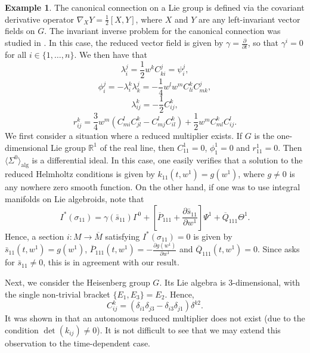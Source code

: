 \documentclass[11pt]{article}
\theoremstyle{plain}
\theoremstyle{definition}
\newtheorem{example}{Example}
\begin{document}
\begin{example}
The canonical connection on a Lie group is defined via the covariant derivative operator $\nabla_X Y=\frac{1}{2}[X,Y]$, where $X$ and $Y$ are any left-invariant vector fields on $G$. The invariant inverse problem for the canonical connection was studied in \cite{crampin2008invariantinv,muzsnay2005invariantinv}. In this case, the reduced vector field is given by $\gamma=\frac{\partial}{\partial t}$, so that $\gamma^i=0$ for all $i\in \{1,\dots,n\}$. We then have that
\begin{equation*}
    \lambda_i^j=\frac{1}{2}w^k C_{ki}^j=\psi_i^j,
\end{equation*}
\begin{equation*}
    \phi_i^j=-\lambda_i^k \lambda_k^j=-\frac{1}{4}w^l w^m C_{li}^k C_{mk}^j,
\end{equation*}
\begin{equation*}
    \lambda_{ij}^k=-\frac{1}{2}C_{ij}^k,
\end{equation*}
\begin{equation*}
    r_{ij}^k=\frac{3}{4}w^m(C_{mi}^l C_{jl}^k-C_{mj}^l C_{il}^k)+\frac{1}{2}w^m C_{ml}^k C_{ij}^l.
\end{equation*}
We first consider a situation where a reduced multiplier exists. If $G$ is the one-dimensional Lie group ${\mathbb R}^1$ of the real line, then $C_{11}^1=0$, $\phi_1^1=0$ and $r_{11}^1=0$. Then $\langle \Sigma^0\rangle_{\mathrm{alg}}$ is a differential ideal. In this case, one easily verifies that a solution to the reduced Helmholtz conditions is given by $k_{11}(t,w^1)=g(w^1)$, where $g\neq 0$ is any nowhere zero smooth function. On the other hand, if one was to use integral manifolds on Lie algebroids, note that
\begin{equation*}
    I^{\ast}(\sigma_{11})=\gamma(\bar{s}_{11})\Gamma^0+\left[\overline{P}_{111}+\frac{\partial \bar{s}_{11}}{\partial w^1}\right]\Psi^1+\overline{Q}_{111}\Theta^1.
\end{equation*}
Hence, a section $i\colon M\to \overline{M}$ satisfying $I^{\ast}(\sigma_{11})=0$ is given by $\bar{s}_{11}(t,w^1)=g(w^1)$, $\overline{P}_{111}(t,w^1)=-\frac{\partial g(w^1)}{\partial w^1}$ and $\overline{Q}_{111}(t,w^1)=0$. Since  asks for $\bar{s}_{11}\neq 0$, this is in agreement with our result. 

Next, we consider the Heisenberg group $G$. Its Lie algebra is $3$-dimensional, with the single non-trivial bracket $\{E_1,E_3\}=E_2$. Hence,
\begin{equation*}
    C_{ij}^k=(\delta_{i1}\delta_{j3}-\delta_{i3}\delta_{j1})\delta^{k2}.
\end{equation*}
It was shown in \cite{crampin2008invariantinv} that an autonomous reduced multiplier does not exist (due to the condition $\det(k_{ij})\neq 0$). It is not difficult to see that we may extend this observation to the time-dependent case.


\end{example}
\end{document}
